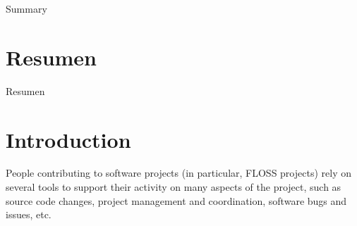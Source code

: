 \documentclass[a4paper, 12pt]{book}
\begin{document}
Summary

\chapter*{Resumen}

Resumen



\tableofcontents
\cleardoublepage
\listoffigures %


\cleardoublepage
\chapter{Introduction}
\label{sec:intro} %

People contributing to software projects (in particular, FLOSS projects) rely on several tools to support their activity on many aspects of the project, such as source code changes, project management and coordination, software bugs and issues, etc.
\end{document}
